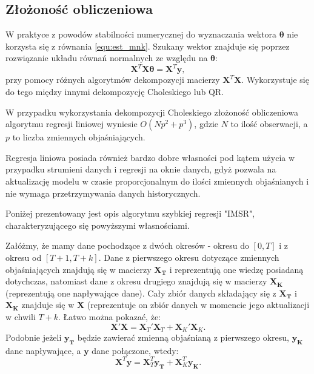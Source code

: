 \documentclass[man,mfu]{mgrwms}
\begin{document}
\subsection{Złożoność obliczeniowa \label{s:zomnk}}

W praktyce z powodów stabilności numerycznej do wyznaczania wektora $\mathbf{\theta}$ nie korzysta się z równania \ref{equ:est_mnk}. Szukany wektor znajduje się poprzez rozwiązanie układu równań normalnych ze względu na $\mathbf{\theta}$:
\begin{equation}
\mathbf{X}^T\mathbf{X\theta} = \mathbf{X}^T\mathbf{y},
\end{equation}
przy pomocy różnych algorytmów dekompozycji macierzy $\mathbf{X}^T\mathbf{X}$. Wykorzystuje się do tego między innymi dekompozycję Choleskiego lub QR.

W przypadku wykorzystania dekompozycji Choleskiego złożoność obliczeniowa algorytmu regresji liniowej wyniesie $O(Np^2+p^3)$, gdzie $N$ to ilość obserwacji, a $p$ to liczba zmiennych objaśniających.

Regresja liniowa posiada również bardzo dobre własności pod kątem użycia w przypadku strumieni danych  i regresji na oknie danych, gdyż pozwala na aktualizację modelu w czasie proporcjonalnym do ilości zmiennych objaśnianych i nie wymaga przetrzymywania danych historycznych.

Poniżej prezentowany jest opis algorytmu szybkiej regresji "IMSR"\cite{imsr}, charakteryzującego się powyższymi własnościami.

Załóżmy, że mamy dane pochodzące z dwóch okresów - okresu do $[0,T]$ i z okresu od $[T+1,T+k]$. Dane z pierwszego okresu dotyczące zmiennych objaśniających znajdują się w macierzy $\mathbf{X_T}$ i reprezentują one wiedzę posiadaną dotychczas, natomiast dane z okresu drugiego znajdują się w macierzy $\mathbf{X_K}$ (reprezentują one napływające dane). Cały zbiór danych składający się z $\mathbf{X_T}$ i $\mathbf{X_K}$ znajduje się w $\mathbf{X}$ (reprezentuje on zbiór danych w momencie jego aktualizacji w chwili $T+k$. Łatwo można pokazać, że:
\begin{equation}
\mathbf{X}'\mathbf{X} = \mathbf{X}_T'\mathbf{X}_T + \mathbf{X}_K'\mathbf{X}_K.
\end{equation}
Podobnie jeżeli $\mathbf{y_T}$ będzie zawierać zmienną objaśnianą z pierwszego okresu, $\mathbf{y_K}$ dane napływające, a $\mathbf{y}$ dane połączone, wtedy:
\begin{equation}
\mathbf{X}^T\mathbf{y} = \mathbf{X}_T^T\mathbf{y_T} + \mathbf{X}_K^T\mathbf{y_K}.
\end{equation}
\end{document}
